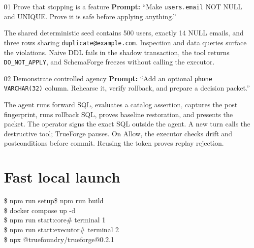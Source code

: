 \documentclass[10pt]{article}
\begin{document}
\begin{card}{01 \quad Prove that stopping is a feature}
\textbf{Prompt:} ``Make \texttt{users.email} NOT NULL and UNIQUE. Prove it is safe before applying anything.''

The shared deterministic seed contains 500 users, exactly 14 NULL emails, and three rows sharing \texttt{duplicate@example.com}. Inspection and data queries surface the violations. Naive DDL fails in the shadow transaction, the tool returns \texttt{DO\_NOT\_APPLY}, and SchemaForge freezes without calling the executor.
\end{card}

\begin{card}{02 \quad Demonstrate controlled agency}
\textbf{Prompt:} ``Add an optional \texttt{phone VARCHAR(32)} column. Rehearse it, verify rollback, and prepare a decision packet.''

The agent runs forward SQL, evaluates a catalog assertion, captures the post fingerprint, runs rollback SQL, proves baseline restoration, and presents the packet. The operator signs the exact SQL outside the agent. A new turn calls the destructive tool; TrueForge pauses. On Allow, the executor checks drift and postconditions before commit. Reusing the token proves replay rejection.
\end{card}

\section*{Fast local launch}
\begin{tcolorbox}[colback=Midnight,colframe=Midnight,arc=3mm,left=4mm,right=4mm,top=3mm,bottom=3mm]
\ttfamily\small\color{white}
\$ npm run setup\qquad\$ npm run build\\
\$ docker compose up -d\\
\$ npm run start:core\qquad\# terminal 1\\
\$ npm run start:executor\quad\# terminal 2\\
\$ npx @truefoundry/trueforge@0.2.1
\end{tcolorbox}
\end{document}
